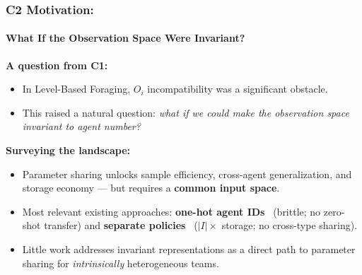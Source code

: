 %

\begin{frame}
    \frametitle{C2 Motivation:}
    \framesubtitle{What If the Observation Space Were Invariant?}

    \textbf{A question from C1:}
    \begin{itemize}
        \item In Level-Based Foraging, \(O_i\) incompatibility
            was a significant obstacle.
        \item This raised a natural question: \emph{what if we could make
            the observation space invariant to agent number?}
    \end{itemize}

    \vspace{0.4em}
    \textbf{Surveying the landscape:}
    \begin{itemize}
        \item Parameter sharing unlocks sample efficiency, cross-agent
            generalization, and storage economy — but requires a
            \textbf{common input space}.
        \item Most relevant existing approaches:
            \textbf{one-hot agent IDs}~\cite{terry2020}
                (brittle; no zero-shot transfer) and
            \textbf{separate policies}~\cite{papoudakis2021}
                ($|I|\times$ storage; no cross-type sharing).
        \item Little work addresses invariant representations
            as a direct path to parameter sharing for
            \emph{intrinsically} heterogeneous teams.
    \end{itemize}


\end{frame}


